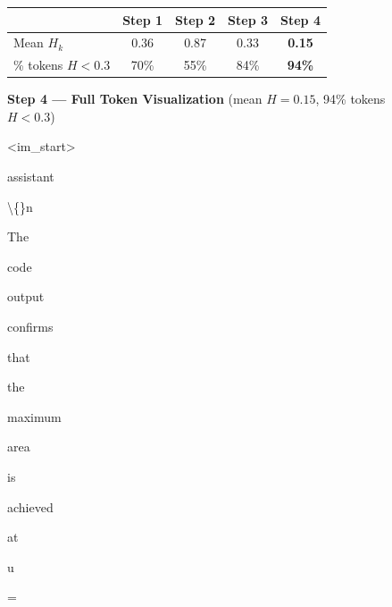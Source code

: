 \begin{figure}[p]
\begin{tcolorbox}
\medskip
\noindent
\begin{minipage}{\linewidth}
\centering
\footnotesize
\begin{tabular}{lcccc}
\toprule
 & Step 1 & Step 2 & Step 3 & \textbf{Step 4} \\
\midrule
Mean $H_k$ & 0.36 & 0.87 & 0.33 & \textbf{0.15} \\
\% tokens $H{<}0.3$ & 70\% & 55\% & 84\% & \textbf{94\%} \\
\bottomrule
\end{tabular}
\end{minipage}

\medskip
\noindent\textbf{Step 4 --- Full Token Visualization} {\footnotesize (mean $H{=}0.15$, 94\% tokens $H{<}0.3$)}

\smallskip
\setlength{\fboxsep}{1.2pt}%
\noindent
\colorbox{green!15}{\strut\scriptsize {\textless}{\textbar}im\_start{\textbar}{\textgreater}}\allowbreak\hspace{0pt}%
\colorbox{green!72}{\strut\scriptsize assistant}\allowbreak\hspace{0pt}%
\colorbox{green!79}{\strut\scriptsize \textbackslash\{\}n}\allowbreak\hspace{0pt}%
\colorbox{green!76}{\strut\scriptsize The}\allowbreak\hspace{0pt}%
\colorbox{green!79}{\strut\scriptsize  code}\allowbreak\hspace{0pt}%
\colorbox{green!79}{\strut\scriptsize  output}\allowbreak\hspace{0pt}%
\colorbox{green!78}{\strut\scriptsize  confirms}\allowbreak\hspace{0pt}%
\colorbox{green!79}{\strut\scriptsize  that}\allowbreak\hspace{0pt}%
\colorbox{green!79}{\strut\scriptsize  the}\allowbreak\hspace{0pt}%
\colorbox{green!79}{\strut\scriptsize  maximum}\allowbreak\hspace{0pt}%
\colorbox{green!79}{\strut\scriptsize  area}\allowbreak\hspace{0pt}%
\colorbox{green!77}{\strut\scriptsize  is}\allowbreak\hspace{0pt}%
\colorbox{green!79}{\strut\scriptsize  achieved}\allowbreak\hspace{0pt}%
\colorbox{green!79}{\strut\scriptsize  at}\allowbreak\hspace{0pt}%
\colorbox{green!79}{\strut\scriptsize  u}\allowbreak\hspace{0pt}%
\colorbox{green!79}{\strut\scriptsize {=}}\allowbreak\hspace{0pt}%

\end{tcolorbox}
\end{figure}

